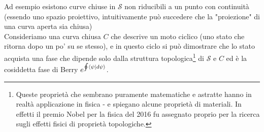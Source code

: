 \documentclass[FisicaTeorica.tex]{subfiles}
\begin{document}
\begin{enumerate}
	Ad esempio esistono curve chiuse in $\mathcal{S}$ non riducibili a un punto con continuità (essendo uno spazio proiettivo, intuitivamente può succedere che la "proiezione" di una curva aperta sia chiusa)\\
	Consideriamo una curva chiusa $C$ che descrive un moto ciclico (uno stato che ritorna dopo un po' su se stesso), e in questo ciclo si può dimostrare che lo stato acquista una fase che dipende solo dalla struttura topologica\footnote{Queste proprietà che sembrano puramente matematiche e astratte hanno in realtà applicazione in fisica - e spiegano alcune proprietà di materiali. In effetti il premio Nobel per la fisica del 2016 fu assegnato proprio per la ricerca sugli effetti fisici di proprietà topologiche.} di $\mathcal{S}$ e $C$ ed è la cosiddetta fase di Berry $e^{\oint \braket{\psi|d\psi}}$. 
\end{enumerate}
	
\end{document}
